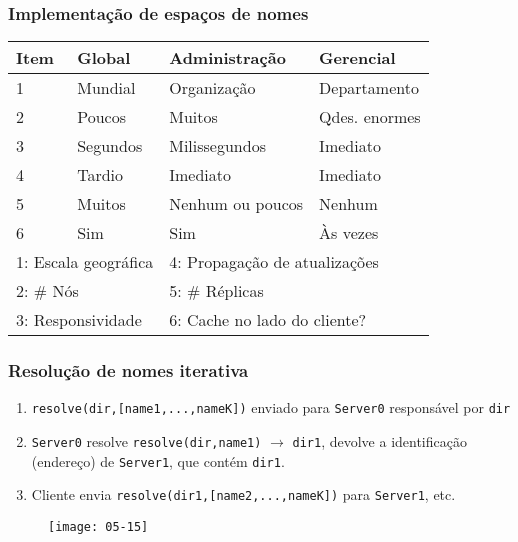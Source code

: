 \documentclass[Ligatures=TeX,table,brazil,svgnames,usetotalslideindicator,compress,10pt]{beamer}
\begin{document}
\begin{frame}
  \frametitle{Implementação de espaços de nomes}

  \begin{center}
    \small
    \renewcommand{\arraystretch}{1.1}
    \begin{tabular}{|l|l|l|l|}\hline
      \alert{\textbf{Item}} & \alert{\textbf{Global}} & \alert{\textbf{Administração}} & \alert{\textbf{Gerencial}}\\ \hline
      1 & Mundial	& Organização 	& Departamento 	\\ \hline
      2 & Poucos 		& Muitos 			& Qdes. enormes 	\\ \hline
      3 & Segundos 	& Milissegundos 	& Imediato 	\\ \hline
      4 & Tardio 		& Imediato 	& Imediato 	\\ \hline
      5 & Muitos 		& Nenhum ou poucos 	& Nenhum 			\\ \hline
      6 & Sim 		& Sim 			& Às vezes 	\\ \hline\hline
      \multicolumn{2}{|l|}{1: Escala geográfica} & \multicolumn{2}{l|}{4: Propagação de atualizações} \\
      \multicolumn{2}{|l|}{2: \# Nós} 			& \multicolumn{2}{l|}{5: \# Réplicas} \\
      \multicolumn{2}{|l|}{3: Responsividade} 	& \multicolumn{2}{l|}{6: Cache no lado do cliente?} \\ \hline
    \end{tabular}
  \end{center}

\end{frame}

\begin{frame}
  \frametitle{Resolução de nomes iterativa}


  \begin{enumerate}

  \item \texttt{resolve(dir,[name1,...,nameK])} enviado para \texttt{Server0} responsável por \texttt{dir}
  \item \texttt{Server0} resolve \texttt{resolve(dir,name1)} $\rightarrow$ \texttt{dir1}, devolve a identificação
     (endereço) de \texttt{Server1}, que contém \texttt{dir1}.
  \item Cliente envia \texttt{resolve(dir1,[name2,...,nameK])} para \texttt{Server1}, etc.

  \end{enumerate}

  \begin{figure}
    \centering
    \texttt{[image: 05-15]}
  \end{figure}

\end{frame}
\end{document}
